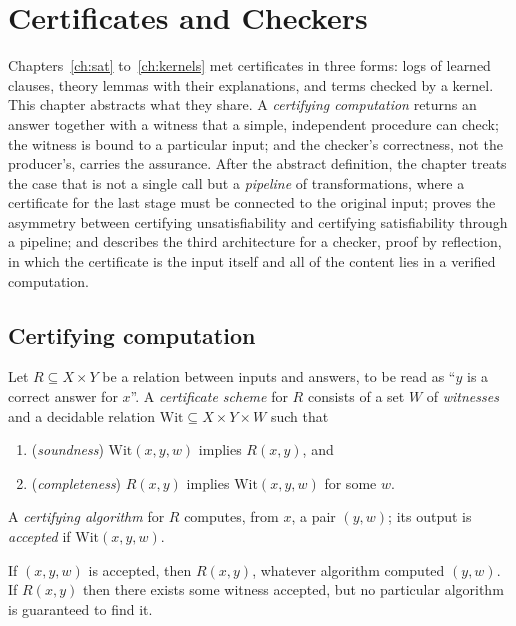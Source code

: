 \chapter{Certificates and Checkers}
\label{ch:certificates}

Chapters~\ref{ch:sat} to~\ref{ch:kernels} met certificates in three forms: logs of learned clauses, theory lemmas with their explanations, and terms checked by a kernel. This chapter abstracts what they share. A \emph{certifying computation} returns an answer together with a witness that a simple, independent procedure can check; the witness is bound to a particular input; and the checker's correctness, not the producer's, carries the assurance. After the abstract definition, the chapter treats the case that is not a single call but a \emph{pipeline} of transformations, where a certificate for the last stage must be connected to the original input; proves the asymmetry between certifying unsatisfiability and certifying satisfiability through a pipeline; and describes the third architecture for a checker, proof by reflection, in which the certificate is the input itself and all of the content lies in a verified computation.

\section{Certifying computation}
\label{sec:certifying}

\begin{definition}
\label{def:cert-scheme}
Let $R\subseteq X\times Y$ be a relation between inputs and answers, to be read as ``$y$ is a correct answer for $x$''. A \emph{certificate scheme} for $R$ consists of a set $W$ of \emph{witnesses} and a decidable relation $\mathrm{Wit}\subseteq X\times Y\times W$ such that
\begin{enumerate}[label=(\roman*),nosep]
\item (\emph{soundness}) $\mathrm{Wit}(x,y,w)$ implies $R(x,y)$, and
\item (\emph{completeness}) $R(x,y)$ implies $\mathrm{Wit}(x,y,w)$ for some $w$.
\end{enumerate}
A \emph{certifying algorithm} for $R$ computes, from $x$, a pair $(y,w)$; its output is \emph{accepted} if $\mathrm{Wit}(x,y,w)$.
\end{definition}

\begin{theorem}
\label{thm:assurance-checker}
If $(x,y,w)$ is accepted, then $R(x,y)$, whatever algorithm computed $(y,w)$. If $R(x,y)$ then there exists some witness accepted, but no particular algorithm is guaranteed to find it.
\end{theorem}

